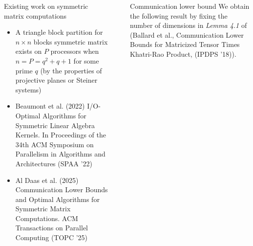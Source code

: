 \documentclass[final]{beamer}
\newlength{\sepwidth}
\newlength{\colwidth}
\newcommand{\separatorcolumn}{\begin{column}{\sepwidth}\end{column}}
\begin{document}
\begin{frame}[t]
\begin{columns}[t]
\begin{column}{\colwidth}
\begin{block}{Existing work on symmetric matrix computations}
\begin{minipage}{0.475\linewidth}
\begin{center}
	
\end{center}
\end{minipage}	

\begin{itemize}
	\item A triangle block partition for $n \times n$ blocks symmetric matrix exists on $P$ processors when $n=P=q^2+q+1$ for some prime $q$ (by the properties of projective planes or Steiner systems) 
\end{itemize}
{\small
\begin{itemize}
	\item Beaumont et al. (2022) I/O-Optimal Algorithms for Symmetric Linear Algebra Kernels. In Proceedings of the 34th ACM Symposium on Parallelism in Algorithms and Architectures (SPAA '22)
	\item Al Daas et al. (2025) Communication Lower Bounds and Optimal Algorithms for Symmetric Matrix Computations. ACM Transactions on Parallel Computing (TOPC '25)
\end{itemize}
}

\end{block}



\end{column}

\separatorcolumn

\begin{column}{\colwidth}

\begin{block}{Communication lower bound}
	We obtain the following result by fixing the number of dimensions in \emph{Lemma 4.1} of (Ballard et al., Communication Lower Bounds for Matricized Tensor Times Khatri-Rao Product, (IPDPS '18)).
	

\end{block}
\end{column}
\end{columns}
\end{frame}
\end{document}
